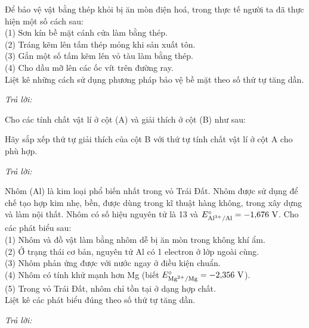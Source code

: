 \documentclass[11pt,a4paper]{article}
\def\loigiai#1{}
\begin{document}
\begin{ex}
Để bảo vệ vật bằng thép khỏi bị ăn mòn điện hoá, trong thực tế người ta đã thực hiện một số cách sau:\\
(1) Sơn kín bề mặt cánh cửa làm bằng thép.\\
(2) Tráng kẽm lên tấm thép mỏng khi sản xuất tôn.\\
(3) Gắn một số tấm kẽm lên vỏ tàu làm bằng thép.\\
(4) Cho dầu mỡ lên các ốc vít trên đường ray.\\
Liệt kê những cách sử dụng phương pháp bảo vệ bề mặt theo số thứ tự tăng dần.
\par\noindent\textit{Trả lời:} \dotfill
\loigiai{}
\end{ex}

\begin{ex}
Cho các tính chất vật lí ở cột (A) và giải thích ở cột (B) như sau:
\par{}\vspace{1pt}
Hãy sắp xếp thứ tự giải thích của cột B với thứ tự tính chất vật lí ở cột A cho phù hợp.
\par\noindent\textit{Trả lời:} \dotfill
\loigiai{}
\end{ex}

\begin{ex}
Nhôm (Al) là kim loại phổ biến nhất trong vỏ Trái Đất. Nhôm được sử dụng để chế tạo hợp kim nhẹ, bền, được dùng trong kĩ thuật hàng không, trong xây dựng và làm nội thất. Nhôm có số hiệu nguyên tử là 13 và $E^\circ_{\ce{Al^3+/Al}} = -1{,}676\text{ V}$. Cho các phát biểu sau:\\
(1) Nhôm và đồ vật làm bằng nhôm dễ bị ăn mòn trong không khí ẩm.\\
(2) Ở trạng thái cơ bản, nguyên tử Al có 1 electron ở lớp ngoài cùng.\\
(3) Nhôm phản ứng được với nước ngay ở điều kiện chuẩn.\\
(4) Nhôm có tính khử mạnh hơn Mg (biết $E^\circ_{\ce{Mg^2+/Mg}} = -2{,}356\text{ V}$).\\
(5) Trong vỏ Trái Đất, nhôm chỉ tồn tại ở dạng hợp chất.\\
Liệt kê các phát biểu đúng theo số thứ tự tăng dần.
\par\noindent\textit{Trả lời:} \dotfill
\loigiai{}
\end{ex}
\end{document}
